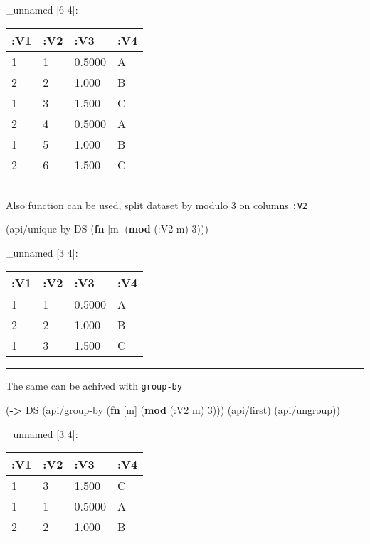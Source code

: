 \documentclass[]{article}
\newenvironment{Shaded}{\begin{snugshade}}{\end{snugshade}}
\newcommand{\KeywordTok}[1]{\textcolor[rgb]{0.13,0.29,0.53}{\textbf{#1}}}
\newcommand{\DecValTok}[1]{\textcolor[rgb]{0.00,0.00,0.81}{#1}}
\newcommand{\AttributeTok}[1]{\textcolor[rgb]{0.77,0.63,0.00}{#1}}
\newcommand{\NormalTok}[1]{#1}
\begin{document}
\_unnamed {[}6 4{]}:

\begin{longtable}[]{@{}llll@{}}
\toprule
:V1 & :V2 & :V3 & :V4\tabularnewline
\midrule
\endhead
1 & 1 & 0.5000 & A\tabularnewline
2 & 2 & 1.000 & B\tabularnewline
1 & 3 & 1.500 & C\tabularnewline
2 & 4 & 0.5000 & A\tabularnewline
1 & 5 & 1.000 & B\tabularnewline
2 & 6 & 1.500 & C\tabularnewline
\bottomrule
\end{longtable}

\begin{center}\rule{0.5\linewidth}{0.5pt}\end{center}

Also function can be used, split dataset by modulo 3 on columns
\texttt{:V2}

\begin{Shaded}
\begin{Highlighting}[]
\NormalTok{(api/unique-by DS (}\KeywordTok{fn}\NormalTok{ [m] (}\KeywordTok{mod}\NormalTok{ (}\AttributeTok{:V2}\NormalTok{ m) }\DecValTok{3}\NormalTok{)))}
\end{Highlighting}
\end{Shaded}

\_unnamed {[}3 4{]}:

\begin{longtable}[]{@{}llll@{}}
\toprule
:V1 & :V2 & :V3 & :V4\tabularnewline
\midrule
\endhead
1 & 1 & 0.5000 & A\tabularnewline
2 & 2 & 1.000 & B\tabularnewline
1 & 3 & 1.500 & C\tabularnewline
\bottomrule
\end{longtable}

\begin{center}\rule{0.5\linewidth}{0.5pt}\end{center}

The same can be achived with \texttt{group-by}

\begin{Shaded}
\begin{Highlighting}[]
\NormalTok{(}\KeywordTok{->}\NormalTok{ DS}
\NormalTok{    (api/group-by (}\KeywordTok{fn}\NormalTok{ [m] (}\KeywordTok{mod}\NormalTok{ (}\AttributeTok{:V2}\NormalTok{ m) }\DecValTok{3}\NormalTok{)))}
\NormalTok{    (api/first)}
\NormalTok{    (api/ungroup))}
\end{Highlighting}
\end{Shaded}

\_unnamed {[}3 4{]}:

\begin{longtable}[]{@{}llll@{}}
\toprule
:V1 & :V2 & :V3 & :V4\tabularnewline
\midrule
\endhead
1 & 3 & 1.500 & C\tabularnewline
1 & 1 & 0.5000 & A\tabularnewline
2 & 2 & 1.000 & B\tabularnewline
\bottomrule
\end{longtable}
\end{document}
